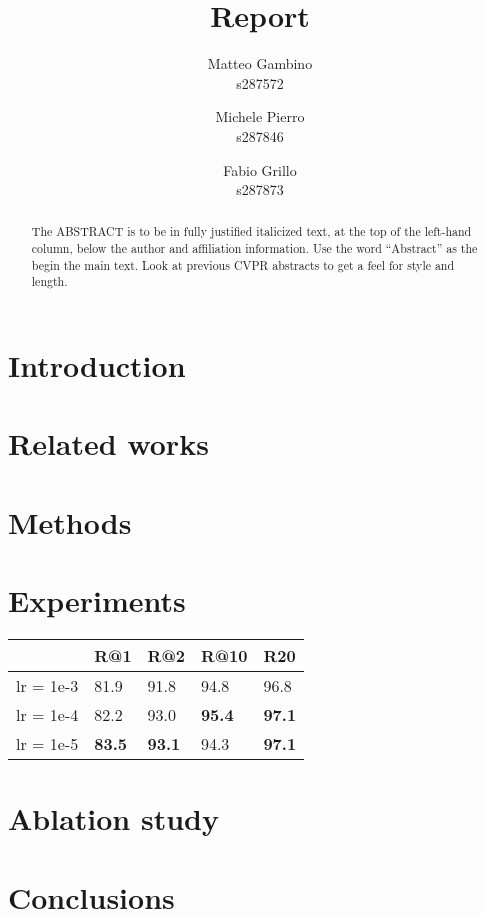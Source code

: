 \documentclass[10pt,twocolumn,letterpaper]{article}
\begin{document}
\title{Report}

\author{Matteo Gambino\\
s287572
\and
Michele Pierro\\
s287846
\and
Fabio Grillo\\
s287873
}
\maketitle

\begin{abstract}
   The ABSTRACT is to be in fully justified italicized text, at the top of the left-hand column, below the author and affiliation information.
   Use the word ``Abstract'' as the begin the main text.
   Look at previous CVPR abstracts to get a feel for style and length.
\end{abstract}

\section{Introduction}

\section{Related works}
\section{Methods}
\section{Experiments}
 \begin{tabular}{|l|l|l|l|l|}
\hline
          & R@1       &  R@2    & R@10 & R20      \\
\hline
lr = 1e-3            & 81.9    & 91.8 & 94.8 & 96.8          \\
\hline
lr = 1e-4            & 82.2    & 93.0 & \textbf{95.4} & \textbf{97.1}          \\
\hline
lr = 1e-5            & \textbf{83.5}    & \textbf{93.1} & 94.3 & \textbf{97.1}          \\
\hline
\end{tabular}
\section{Ablation study}
\section{Conclusions}

{\small


}
\end{document}
